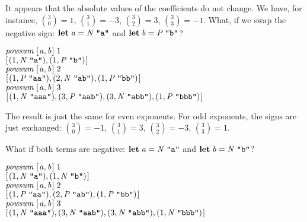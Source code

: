 \documentclass[tikz]{scrreprt}
\newcommand{\Conid}[1]{\mathit{#1}}
\newcommand{\Varid}[1]{\mathit{#1}}
\begin{document}
It appears that the absolute values of the coefficients 
do not change. We have, for instance,
$\binom{3}{0} = 1$,
$\binom{3}{1} = -3$,
$\binom{3}{2} = 3$,
$\binom{3}{3} = -1$.
What, if we swap the negative sign:
\ensuremath{\mathbf{let}\;\Varid{a}\mathrel{=}\Conid{N}\;\text{\tt \char34 a\char34}} and \ensuremath{\mathbf{let}\;\Varid{b}\mathrel{=}\Conid{P}\;\text{\tt \char34 b\char34}}?

\ensuremath{\Varid{powsum}\;[\mskip1.5mu \Varid{a},\Varid{b}\mskip1.5mu]\;\mathrm{1}}\\
\ensuremath{[\mskip1.5mu (\mathrm{1},\Conid{N}\;\text{\tt \char34 a\char34}),(\mathrm{1},\Conid{P}\;\text{\tt \char34 b\char34})\mskip1.5mu]}\\[12pt]
\ensuremath{\Varid{powsum}\;[\mskip1.5mu \Varid{a},\Varid{b}\mskip1.5mu]\;\mathrm{2}}\\
\ensuremath{[\mskip1.5mu (\mathrm{1},\Conid{P}\;\text{\tt \char34 aa\char34}),(\mathrm{2},\Conid{N}\;\text{\tt \char34 ab\char34}),(\mathrm{1},\Conid{P}\;\text{\tt \char34 bb\char34})\mskip1.5mu]}\\[12pt]
\ensuremath{\Varid{powsum}\;[\mskip1.5mu \Varid{a},\Varid{b}\mskip1.5mu]\;\mathrm{3}}\\
\ensuremath{[\mskip1.5mu (\mathrm{1},\Conid{N}\;\text{\tt \char34 aaa\char34}),(\mathrm{3},\Conid{P}\;\text{\tt \char34 aab\char34}),(\mathrm{3},\Conid{N}\;\text{\tt \char34 abb\char34}),(\mathrm{1},\Conid{P}\;\text{\tt \char34 bbb\char34})\mskip1.5mu]}

The result is just the same for even exponents.
For odd exponents, the signs are just exchanged:
$\binom{3}{0} = -1$,
$\binom{3}{1} = 3$,
$\binom{3}{2} = -3$,
$\binom{3}{3} = 1$.

What if both terms are negative:
\ensuremath{\mathbf{let}\;\Varid{a}\mathrel{=}\Conid{N}\;\text{\tt \char34 a\char34}} and \ensuremath{\mathbf{let}\;\Varid{b}\mathrel{=}\Conid{N}\;\text{\tt \char34 b\char34}}?

\ensuremath{\Varid{powsum}\;[\mskip1.5mu \Varid{a},\Varid{b}\mskip1.5mu]\;\mathrm{1}}\\
\ensuremath{[\mskip1.5mu (\mathrm{1},\Conid{N}\;\text{\tt \char34 a\char34}),(\mathrm{1},\Conid{N}\;\text{\tt \char34 b\char34})\mskip1.5mu]}\\[12pt]
\ensuremath{\Varid{powsum}\;[\mskip1.5mu \Varid{a},\Varid{b}\mskip1.5mu]\;\mathrm{2}}\\
\ensuremath{[\mskip1.5mu (\mathrm{1},\Conid{P}\;\text{\tt \char34 aa\char34}),(\mathrm{2},\Conid{P}\;\text{\tt \char34 ab\char34}),(\mathrm{1},\Conid{P}\;\text{\tt \char34 bb\char34})\mskip1.5mu]}\\[12pt]
\ensuremath{\Varid{powsum}\;[\mskip1.5mu \Varid{a},\Varid{b}\mskip1.5mu]\;\mathrm{3}}\\
\ensuremath{[\mskip1.5mu (\mathrm{1},\Conid{N}\;\text{\tt \char34 aaa\char34}),(\mathrm{3},\Conid{N}\;\text{\tt \char34 aab\char34}),(\mathrm{3},\Conid{N}\;\text{\tt \char34 abb\char34}),(\mathrm{1},\Conid{N}\;\text{\tt \char34 bbb\char34})\mskip1.5mu]}
\end{document}
